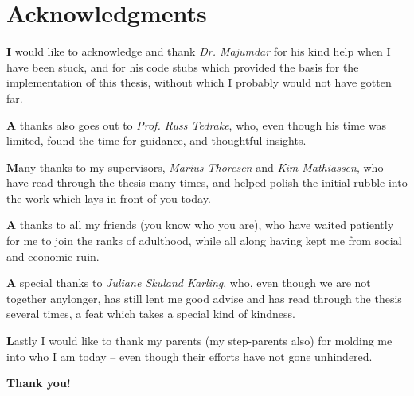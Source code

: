 \chapter{Acknowledgments}

\noindent \textsf{\textbf{I}} would like to acknowledge and thank \textit{Dr.
  Majumdar} for his kind help when I have been stuck, and for his code stubs
which provided the basis for the implementation of this thesis, without which I
probably would not have gotten far.

\vspace{1em}

\noindent \textsf{\textbf{A}} thanks also goes out to \textit{Prof. Russ
  Tedrake}, who, even though his time was limited, found the time for guidance,
and thoughtful insights.

\vspace{1em}

\noindent \textsf{\textbf{M}}any thanks to my supervisors, \textit{Marius
  Thoresen} and \textit{Kim Mathiassen}, who have read through the thesis many
times, and helped polish the initial rubble into the work which lays in front of
you today.

\vspace{1em}

\noindent \textsf{\textbf{A}} thanks to all my friends (you know who you are),
who have waited patiently for me to join the ranks of adulthood, while all along
having kept me from social and economic ruin.

\vspace{1em}

\noindent \textsf{\textbf{A}} special thanks to \textit{Juliane Skuland
  Karling}, who, even though we are not together anylonger, has still lent me
good advise and has read through the thesis several times, a feat which takes a
special kind of kindness.

\vspace{1em}

\noindent \textsf{\textbf{L}}astly I would like to thank my parents (my
step-parents also) for molding me into who I am today -- even though their
efforts have not gone unhindered.

\vspace{1em}

{
  \centering \textsf{\textbf{Thank you!}}\par
}
